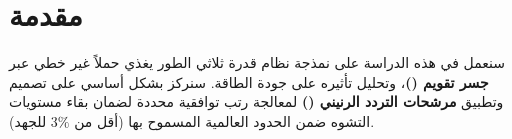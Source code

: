 
\section{مقدمة} \label{part1:sec1}
    \thispagestyle{empty} %
    {\fontsize{16}{28}\selectfont
    سنعمل في هذه الدراسة على نمذجة نظام قدرة ثلاثي الطور يغذي حملاً غير خطي عبر \textbf{جسر تقويم ()}، وتحليل تأثيره على جودة الطاقة. سنركز بشكل أساسي على تصميم وتطبيق \textbf{مرشحات التردد الرنيني ()} لمعالجة رتب توافقية محددة لضمان بقاء مستويات التشوه ضمن الحدود العالمية المسموح بها (أقل من $3\%$ للجهد).
    \par}
    